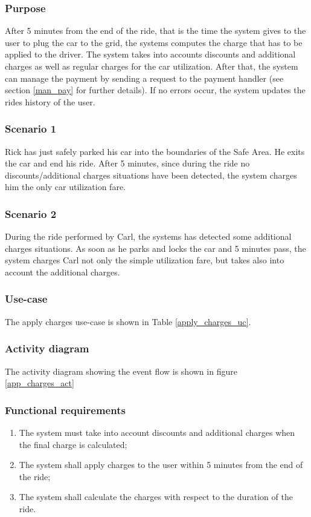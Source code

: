 \subsubsection{Purpose}
After 5 minutes from the end of the ride, that is the time the system gives to the user to plug the car to the grid, the systems computes the charge that has to be applied to the driver. The system takes into accounts discounts and additional charges as well as regular charges for the car utilization. After that, the system can manage the payment by sending a request to the payment handler (see section \ref{man_pay} for further details). If no errors occur, the system updates the rides history of the user.

\subsubsection{Scenario 1}
Rick has just safely parked his car into the boundaries of the Safe Area. He exits the car and end his ride. After 5 minutes, since during the ride no discounts/additional charges situations have been detected, the system charges him the only car utilization fare.

\subsubsection{Scenario 2}
During the ride performed by Carl, the systems has detected some additional charges situations. As soon as he parks and locks the car and 5 minutes pass, the system charges Carl not only the simple utilization fare, but takes also into account the additional charges.

\subsubsection{Use-case}
The apply charges use-case is shown in Table \ref{apply_charges_uc}.

\subsubsection{Activity diagram}
The activity diagram showing the event flow is shown in figure \ref{app_charges_act}

\subsubsection{Functional requirements}
\begin{enumerate}
\item The system must take into account discounts and additional charges when the final charge is calculated;
\item The system shall apply charges to the user within 5 minutes from the end of the ride;
\item The system shall calculate the charges with respect to the duration of the ride.
\end{enumerate}

